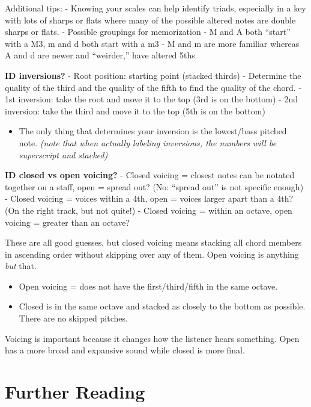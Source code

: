 \documentclass{book}
\providecommand{\tightlist}{%
  \setlength{\itemsep}{0pt}\setlength{\parskip}{0pt}}
\begin{document}
Additional tips: - Knowing your scales can help identify triads, especially in
a key with lots of sharps or flats where many of the possible altered notes
are double sharps or flats. - Possible groupings for memorization - M and A
both ``start'' with a M3, m and d both start with a m3 - M and m are more
familiar whereas A and d are newer and ``weirder,'' have altered 5ths

\textbf{ID inversions?} - Root position: starting point (stacked thirds) -
Determine the quality of the third and the quality of the fifth to find the
quality of the chord. - 1st inversion: take the root and move it to the top
(3rd is on the bottom) - 2nd inversion: take the third and move it to the top
(5th is on the bottom)

\begin{itemize}
\tightlist
\item
  The only thing that determines your inversion is the lowest/bass pitched
  note. \emph{(note that when actually labeling inversions, the numbers will
  be superscript and stacked)}
\end{itemize}

\textbf{ID closed vs open voicing?} - Closed voicing = closest notes can be
notated together on a staff, open = spread out? (No: ``spread out'' is not
specific enough) - Closed voicing = voices within a 4th, open = voices larger
apart than a 4th? (On the right track, but not quite!) - Closed voicing =
within an octave, open voicing = greater than an octave?

These are all good guesses, but closed voicing means stacking all chord
members in ascending order without skipping over any of them. Open voicing is
anything \emph{but} that.

\begin{itemize}
\tightlist
\item
  Open voicing = does not have the first/third/fifth in the same octave.
\item
  Closed is in the same octave and stacked as closely to the bottom as
  possible. There are no skipped pitches.
\end{itemize}

Voicing is important because it changes how the listener hears something. Open
has a more broad and expansive sound while closed is more final.

\hypertarget{further-reading-7}{%
\chapter{Further Reading}\label{further-reading-7}}
\end{document}
